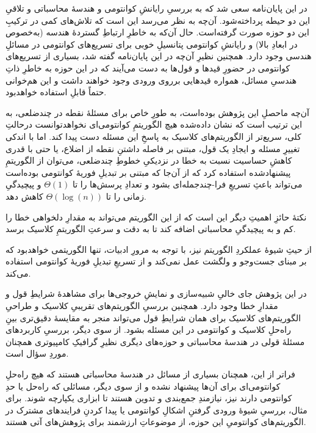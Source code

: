 

در این پایان‌نامه سعی شد که به بررسیِ رایانشِ کوانتومی و هندسهٔ محاسباتی و تلاقیِ این دو حیطه پرداخته‌شود. آن‌چه به نظر می‌رسد این است که تلاش‌های کمی در ترکیبِ این دو حوزه صورت گرفته‌است. حال آن‌که به خاطرِ ارتباطِ گستردهٔ هندسه (به‌خصوص در ابعادِ بالا) و رایانشِ کوانتومی پتانسیلِ خوبی برای تسریع‌های کوانتومی در مسائلِ هندسی وجود دارد.
همچنین نظیرِ آن‌چه در این پایان‌نامه گفته شد، بسیاری از تسریع‌های کوانتومی در حضورِ قیدها و قول‌ها به دست می‌آیند که در این حوزه به خاطرِ ذاتِ هندسیِ مسائل، همواره قیدهایی برروی ورودی وجود خواهند داشت و این هم‌خوانی حتماً قابلِ استفاده خواهدبود.

آن‌چه ماحصلِ این پژوهش بوده‌است، به طورِ خاص برای مسئلهٔ نقطه در چندضلعی، به این ترتیب است که نشان داده‌شده هیچ الگوریتمِ کوانتومی‌ای نخواهدتوانست درحالتِ کلی، سریع‌تر از الگوریتم‌های کلاسیک به پاسخِ این مسئله دست پیدا کند. اما با اندکی تغییرِ مسئله و ایجادِ یک قول، مبتنی بر فاصله داشتنِ نقطه از اضلاع، یا حتی با قدری کاهشِ حساسیت نسبت به خطا در نزدیکیِ خطوطِ چندضلعی، می‌توان از الگوریتمِ پیشنهادشده استفاده کرد که از آن‌جا که مبتنی بر تبدیلِ فوریهٔ کوانتومی بوده‌است می‌تواند باعثِ تسریعِ فرا-چندجمله‌ای بشود و تعدادِ پرسش‌ها را تا $\Theta(1)$ و پیچیدگیِ زمانی را تا 
$\Theta(\log(n))$
کاهش دهد.

نکتهٔ حائزِ اهمیتِ دیگر این است که از این الگوریتم می‌تواند به مقدارِ دلخواهی خطا را کم و به پیچیدگیِ محاسباتی اضافه کند تا به دقت و سرعتِ الگوریتمِ کلاسیک برسد.

از حیثِ شیوهٔ عملکردِ الگوریتم نیز، با توجه به مرورِ ادبیات، تنها الگوریتمی خواهدبود که بر مبنای جست‌وجو و ولگشت عمل نمی‌کند و از تسریعِ تبدیلِ فوریهٔ کوانتومی استفاده می‌کند.


در این پژوهش جای خالیِ شبیه‌سازی و نمایشِ خروجی‌ها برای مشاهدهٔ شرایطِ قول و مقدارِ خطا وجود دارد. همچنین بررسیِ الگوریتم‌های تقریبیِ کلاسیک و طراحیِ الگوریتم‌های کلاسیک برای همان شرایطِ قول می‌تواند منجر به مقایسهٔ دقیق‌تری بینِ راه‌حلِ کلاسیک و کوانتومی در این مسئله بشود. از سوی دیگر، بررسیِ کاربردهای مسئلهٔ قولی در هندسهٔ محاسباتی و حوزه‌های دیگری نظیرِ گرافیکِ کامپیوتری همچنان موردِ سؤال است.

فراتر از این، همچنان بسیاری از مسائل در هندسهٔ محاسباتی هستند که هیچ راه‌حلِ کوانتومی‌ای برای آن‌ها پیشنهاد نشده و از سوی دیگر، مسائلی که راه‌حل یا حدِ کوانتومی دارند نیز، نیازمندِ جمع‌بندی و تدوین هستند تا ابزاری یکپارچه شوند. برای مثال، بررسیِ شیوهٔ ورودی گرفتنِ اشکالِ کوانتومی یا پیدا کردنِ فرایندهای مشترک در الگوریتم‌های کوانتومیِ این حوزه، از موضوعاتِ ارزشمند برای پژوهش‌های آتی هستند.